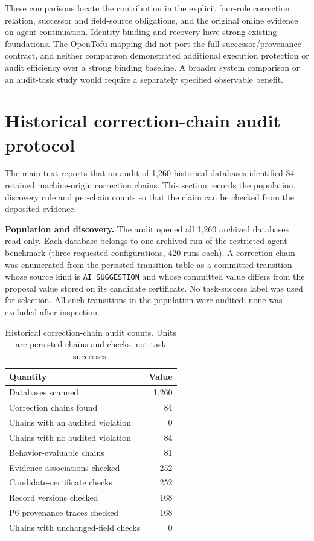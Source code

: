\documentclass[10pt,a4paper]{article}
\begin{document}
These comparisons locate the contribution in the explicit four-role correction relation, successor and field-source obligations, and the original online evidence on agent continuation. Identity binding and recovery have strong existing foundations. The OpenTofu mapping did not port the full successor/provenance contract, and neither comparison demonstrated additional execution protection or audit efficiency over a strong binding baseline. A broader system comparison or an audit-task study would require a separately specified observable benefit.

\section{Historical correction-chain audit protocol}
The main text reports that an audit of 1,260 historical databases identified 84 retained machine-origin correction chains. This section records the population, discovery rule and per-chain counts so that the claim can be checked from the deposited evidence.

\textbf{Population and discovery.} The audit opened all 1,260 archived databases read-only. Each database belongs to one archived run of the restricted-agent benchmark (three requested configurations, 420 runs each). A correction chain was enumerated from the persisted transition table as a committed transition whose source kind is \texttt{AI\_SUGGESTION} and whose committed value differs from the proposal value stored on its candidate certificate. No task-success label was used for selection. All such transitions in the population were audited; none was excluded after inspection.

\begin{table}[htbp]
\centering\small
\caption{Historical correction-chain audit counts. Units are persisted chains and checks, not task successes.}
\begin{tabular}{lr}
\toprule
Quantity & Value \\
\midrule
Databases scanned & 1,260 \\
Correction chains found & 84 \\
Chains with an audited violation & 0 \\
Chains with no audited violation & 84 \\
Behavior-evaluable chains & 81 \\
Evidence associations checked & 252 \\
Candidate-certificate checks & 252 \\
Record versions checked & 168 \\
P6 provenance traces checked & 168 \\
Chains with unchanged-field checks & 0 \\
\bottomrule
\end{tabular}
\end{table}
\end{document}
